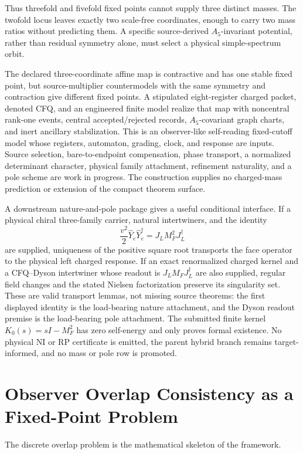 \documentclass[11pt]{article}
\begin{document}
Thus threefold and fivefold fixed points cannot supply three distinct masses.
The twofold locus leaves exactly two scale-free coordinates, enough to carry
two mass ratios without predicting them. A specific source-derived
\(A_5\)-invariant potential, rather than residual symmetry alone, must select
a physical simple-spectrum orbit.

The declared three-coordinate affine map is contractive and
has one stable fixed point, but source-multiplier countermodels with the same
symmetry and contraction give different fixed points. A stipulated eight-register
charged packet, denoted CFQ, and an engineered finite model realize that map with noncentral
rank-one events, central accepted/rejected records, \(A_5\)-covariant graph
charts, and inert ancillary stabilization.  This is an observer-like
self-reading fixed-cutoff model whose registers, automaton, grading, clock, and
response are inputs.  Source selection, bare-to-endpoint compensation, phase
transport, a normalized determinant character, physical family attachment,
refinement naturality, and a pole scheme are work in progress.  The construction
supplies no charged-mass prediction or extension of the compact theorem surface.

A downstream nature-and-pole package gives a useful conditional interface.
If a physical chiral three-family carrier, natural intertwiners, and the
identity
\[
 \frac{v^2}{2}\widehat Y_e\widehat Y_e^\dagger
 =J_LM_F^2J_L^\dagger
\]
are supplied, uniqueness of the positive square root transports the face
operator to the physical left charged response.  If an exact renormalized
charged kernel and a CFQ--Dyson intertwiner whose readout is
\(J_LM_FJ_L^\dagger\) are also supplied, regular field changes and the stated
Nielsen factorization preserve its singularity set.  These are valid transport
lemmas, not missing source theorems: the first displayed identity is the
load-bearing nature attachment, and the Dyson readout premise is the
load-bearing pole attachment.  The submitted finite kernel
\(K_0(s)=sI-M_F^2\) has zero self-energy and only proves formal existence.  No
physical NI or RP certificate is emitted, the parent hybrid branch remains
target-informed, and no mass or pole row is promoted.

\section{Observer Overlap Consistency as a Fixed-Point Problem}

The discrete overlap problem is the mathematical skeleton of the framework.
\end{document}
